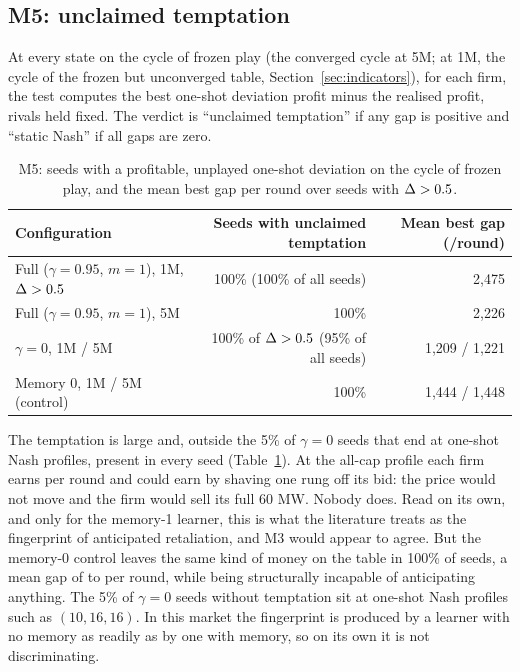 \subsection{M5: unclaimed temptation}

At every state on the cycle of frozen play (the converged cycle at 5M; at 1M, the cycle of the frozen but unconverged table, Section~\ref{sec:indicators}), for each firm, the test computes the best one-shot deviation profit minus the realised profit, rivals held fixed. The verdict is ``unclaimed temptation'' if any gap is positive and ``static Nash'' if all gaps are zero.

\begin{table}[htbp]
\centering
\caption{M5: seeds with a profitable, unplayed one-shot deviation on the cycle of frozen play, and the mean best gap per round over seeds with $\Delta > 0.5$.}
\label{tab:m5}
\small
\begin{tabular}{@{}lrr@{}}
\toprule
Configuration & Seeds with unclaimed temptation & Mean best gap (\eur{}/round) \\
\midrule
Full ($\gamma=0.95$, $m=1$), 1M, $\Delta>0.5$ & 100\% (100\% of all seeds) & 2,475 \\
Full ($\gamma=0.95$, $m=1$), 5M & 100\% & 2,226 \\
$\gamma=0$, 1M / 5M & 100\% of $\Delta>0.5$ (95\% of all seeds) & 1,209 / 1,221 \\
Memory 0, 1M / 5M (control) & 100\% & 1,444 / 1,448 \\
\bottomrule
\end{tabular}
\end{table}

The temptation is large and, outside the 5\% of $\gamma = 0$ seeds that end at one-shot Nash profiles, present in every seed (Table~\ref{tab:m5}). At the all-cap profile each firm earns  per round and could earn  by shaving one rung off its bid: the price would not move and the firm would sell its full 60 MW. Nobody does. Read on its own, and only for the memory-1 learner, this is what the literature treats as the fingerprint of anticipated retaliation, and M3 would appear to agree. But the memory-0 control leaves the same kind of money on the table in 100\% of seeds, a mean gap of  to  per round, while being structurally incapable of anticipating anything. The 5\% of $\gamma = 0$ seeds without temptation sit at one-shot Nash profiles such as $(10,16,16)$. In this market the fingerprint is produced by a learner with no memory as readily as by one with memory, so on its own it is not discriminating.

